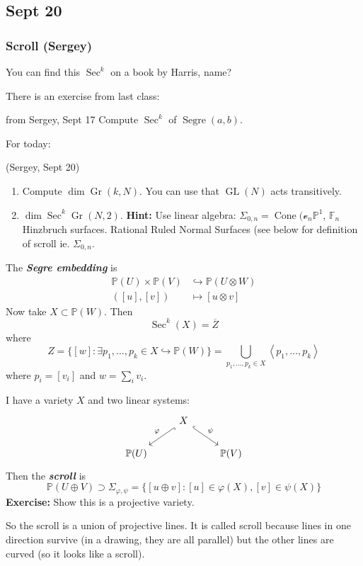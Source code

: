\subsection{Sept 20}
\subsubsection{Scroll (Sergey)}

You can find this $\operatorname{Sec}^k$ on a book by Harris, name?

There is an exercise from last class:
\begin{manualexercise}{from Sergey, Sept 17}
	Compute $\operatorname{Sec}^k $ of $\operatorname{Segre}(a,b)$.
\end{manualexercise}

For today:
\begin{manualexercise}{(Sergey, Sept 20)}\leavevmode 
	\begin{enumerate}[label=\alph*.]
		\item Compute $\dim \operatorname{Gr}(k,N)$. You can use that $\operatorname{GL}(N)$ acts transitively.
		\item $\dim \operatorname{Sec}^k\operatorname{Gr}(N,2)$. \textbf{Hint:} Use linear algebra: $\Sigma_{0,n}=\operatorname{Cone}(\mathcal{v}_{n}\mathbb{P}^1$, $\mathbb{F}_{n}$ Hinzbruch surfaces. Rational Ruled Normal Surfaces (see below for definition of scroll ie. $\Sigma_{0,n}$.
	\end{enumerate}
\end{manualexercise}

\begin{defn}
	The \textit{\textbf{Segre embedding }} is 
	 \begin{align*}
		 \mathbb{P}(U)\times \mathbb{P}(V)&\hookrightarrow \mathbb{P}(U\otimes W)  \\
		 ([u],[v]) &\longmapsto [u\otimes v]
	\end{align*}
	Now take $X\subset \mathbb{P}(W)$. Then
	\[\operatorname{Sec}^k(X)=\overline{Z}\]
	where
	\[Z=\{[w]:\exists p_1,\ldots,p_k\in X\hookrightarrow \mathbb{P}(W)\} =\bigcup_{p_1,\ldots,p_k\in X}\left<p_1,\ldots,p_k\right>  \]
	where $p_i=[v_i]$ and $w=\sum_{i}v_i$.
\end{defn}

\begin{defn}[Scroll]
	I have a variety $X$ and two linear systems:
	\[\begin{tikzcd}
	&X\arrow[dl,"\varphi",hook,swap]\arrow[dr,"\psi",hook]\\
	\mathbb{P}(U)&&\mathbb{P}(V)
	\end{tikzcd}\]
	Then the \textit{\textbf{scroll}} is
	\[\mathbb{P}(U\oplus V)\supset\Sigma_{\varphi,\psi}=\{[u\oplus v]:[u]\in\varphi(X),[v]\in\psi(X)\}\]
	\textbf{Exercise:} Show this is a projective variety.

	So the scroll is a union of projective lines. It is called scroll because lines in one direction survive (in a drawing, they are all parallel) but the other lines are curved (so it looks like a scroll).
\end{defn}

